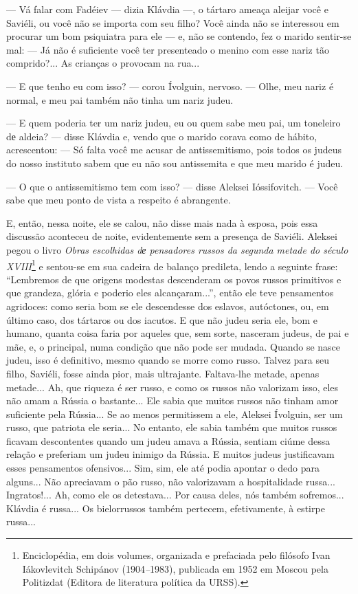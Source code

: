 --- Vá falar com Fadéiev --- dizia Klávdia ---, o tártaro ameaça aleijar
você e Saviéli, ou você não se importa com seu filho? Você ainda não se
interessou em procurar um bom psiquiatra para ele --- e, não se
contendo, fez o marido sentir-se mal: --- Já não é suficiente você ter
presenteado o menino com esse nariz tão comprido?... As crianças o
provocam na rua...

--- E que tenho eu com isso? --- corou Ívolguin, nervoso. --- Olhe, meu
nariz é normal, e meu pai também não tinha um nariz judeu.

--- E quem poderia ter um nariz judeu, eu ou quem sabe meu pai, um
toneleiro dе aldeia? --- disse Klávdia e, vendo que o marido corava como
de hábito, acrescentou: --- Só falta você me acusar de antissemitismo,
pois todos os judeus do nosso instituto sabem que eu não sou antissemita
e que meu marido é judeu.

--- O que o antissemitismo tem com isso? --- disse Aleksei Ióssifovitch.
--- Você sabe que meu ponto de vista a respeito é abrangente.

E, então, nessa noite, ele se calou, não disse mais nada à esposa, pois
essa discussão aconteceu de noite, evidentemente sem a presença de
Saviéli. Aleksei pegou o livro \emph{Obras escolhidas dе pensadores
russos da segunda metade do século XVIII}\footnote{Enciclopédia, em dois
  volumes, organizada e prefaciada pelo filósofo Ivan Iákovlevitch
  Schipánov (1904\emph{--}1983), publicada em 1952 em Moscou pela
  Politizdat (Editora de literatura política da URSS).} e sentou-se em
sua cadeira de balanço predileta, lendo a seguinte frase: ``Lembremos de
que origens modestas descenderam os povos russos primitivos e que
grandeza, glória e poderio eles alcançaram...'', então ele teve
pensamentos agridoces: como seria bom se ele descendesse dos eslavos,
autóctones, ou, em último caso, dos tártaros ou dos iacutos. E que não
judeu seria ele, bom e humano, quanta coisa faria por aqueles que, sem
sorte, nasceram judeus, de pai e mãe, e, o principal, numa condição que
não pode ser mudada. Quando se nasce judeu, isso é definitivo, mesmo
quando se morre como russo. Talvez para seu filho, Saviéli, fosse ainda
pior, mais ultrajante. Faltava-lhe metade, apenas metade... Ah, que
riqueza é ser russo, e como os russos não valorizam isso, eles não amam
a Rússia o bastante... Ele sabia que muitos russos não tinham amor
suficiente pela Rússia... Se ao menos permitissem a ele, Aleksei
Ívolguin, ser um russo, que patriota ele seria... No entanto, ele sabia
também que muitos russos ficavam descontentes quando um judeu amava a
Rússia, sentiam ciúme dessa relação e preferiam um judeu inimigo da
Rússia. E muitos judeus justificavam esses pensamentos ofensivos... Sim,
sim, ele até podia apontar o dedo para alguns... Não apreciavam o pão
russo, não valorizavam a hospitalidade russa... Ingratos!... Ah, como
ele os detestava... Por causa deles, nós também sofremos... Klávdia é
russa... Os bielorrussos também pertecem, efetivamente, à estirpe
russa...

